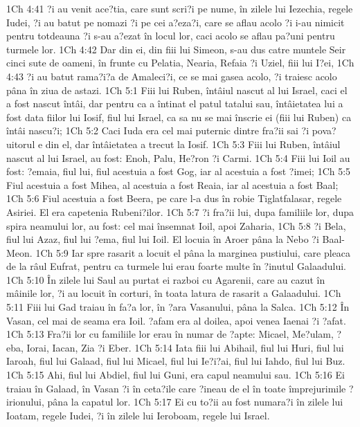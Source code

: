 1Ch 4:41  ?i au venit ace?tia, care sunt scri?i pe nume, în zilele lui Iezechia, regele Iudei, ?i au batut pe nomazi ?i pe cei a?eza?i, care se aflau acolo ?i i-au nimicit pentru totdeauna ?i s-au a?ezat în locul lor, caci acolo se aflau pa?uni pentru turmele lor.
1Ch 4:42  Dar din ei, din fiii lui Simeon, s-au dus catre muntele Seir cinci sute de oameni, în frunte cu Pelatia, Nearia, Refaia ?i Uziel, fiii lui I?ei,
1Ch 4:43  ?i au batut rama?i?a de Amaleci?i, ce se mai gasea acolo, ?i traiesc acolo pâna în ziua de astazi.
1Ch 5:1  Fiii lui Ruben, întâiul nascut al lui Israel, caci el a fost nascut întâi, dar pentru ca a întinat el patul tatalui sau, întâietatea lui a fost data fiilor lui Iosif, fiul lui Israel, ca sa nu se mai înscrie ei (fiii lui Ruben) ca întâi nascu?i;
1Ch 5:2  Caci Iuda era cel mai puternic dintre fra?ii sai ?i pova?uitorul e din el, dar întâietatea a trecut la Iosif.
1Ch 5:3  Fiii lui Ruben, întâiul nascut al lui Israel, au fost: Enoh, Palu, He?ron ?i Carmi.
1Ch 5:4  Fiii lui Ioil au fost: ?emaia, fiul lui, fiul acestuia a fost Gog, iar al acestuia a fost ?imei;
1Ch 5:5  Fiul acestuia a fost Mihea, al acestuia a fost Reaia, iar al acestuia a fost Baal;
1Ch 5:6  Fiul acestuia a fost Beera, pe care l-a dus în robie Tiglatfalasar, regele Asiriei. El era capetenia Rubeni?ilor.
1Ch 5:7  ?i fra?ii lui, dupa familiile lor, dupa spira neamului lor, au fost: cel mai însemnat Ioil, apoi Zaharia,
1Ch 5:8  ?i Bela, fiul lui Azaz, fiul lui ?ema, fiul lui Ioil. El locuia în Aroer pâna la Nebo ?i Baal-Meon.
1Ch 5:9  Iar spre rasarit a locuit el pâna la marginea pustiului, care pleaca de la râul Eufrat, pentru ca turmele lui erau foarte multe în ?inutul Galaadului.
1Ch 5:10  În zilele lui Saul au purtat ei razboi cu Agarenii, care au cazut în mâinile lor, ?i au locuit în corturi, în toata latura de rasarit a Galaadului.
1Ch 5:11  Fiii lui Gad traiau în fa?a lor, în ?ara Vasanului, pâna la Salca.
1Ch 5:12  În Vasan, cel mai de seama era Ioil. ?afam era al doilea, apoi venea Iaenai ?i ?afat.
1Ch 5:13  Fra?ii lor cu familiile lor erau în numar de ?apte: Micael, Me?ulam, ?eba, Iorai, Iacan, Zia ?i Eber.
1Ch 5:14  Iata fiii lui Abihail, fiul lui Huri, fiul lui Iaroah, fiul lui Galaad, fiul lui Micael, fiul lui Ie?i?ai, fiul lui Iahdo, fiul lui Buz.
1Ch 5:15  Ahi, fiul lui Abdiel, fiul lui Guni, era capul neamului sau.
1Ch 5:16  Ei traiau în Galaad, în Vasan ?i în ceta?ile care ?ineau de el în toate împrejurimile ?irionului, pâna la capatul lor.
1Ch 5:17  Ei cu to?ii au fost numara?i în zilele lui Ioatam, regele Iudei, ?i în zilele lui Ieroboam, regele lui Israel.
